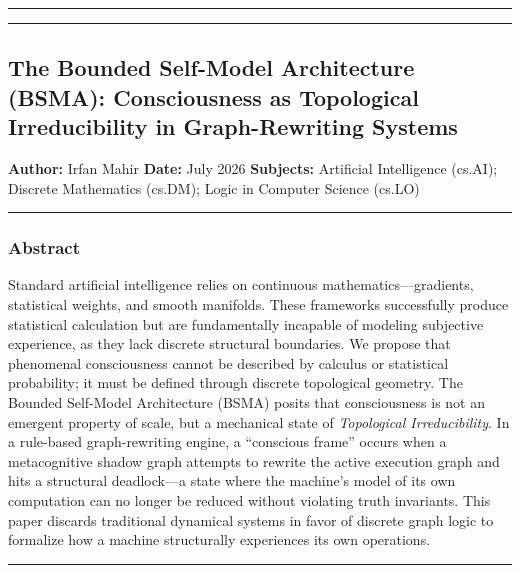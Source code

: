 \documentclass[
  11pt,
  a4paper,
]{article}
\begin{document}
\begin{center}\rule{0.5\linewidth}{0.5pt}\end{center}

\newpage

\begin{center}\rule{0.5\linewidth}{0.5pt}\end{center}

\subsection{The Bounded Self-Model Architecture (BSMA): Consciousness as
Topological Irreducibility in Graph-Rewriting
Systems}\label{the-bounded-self-model-architecture-bsma-consciousness-as-topological-irreducibility-in-graph-rewriting-systems}

\textbf{Author:} Irfan Mahir \textbf{Date:} July 2026 \textbf{Subjects:}
Artificial Intelligence (cs.AI); Discrete Mathematics (cs.DM); Logic in
Computer Science (cs.LO)

\begin{center}\rule{0.5\linewidth}{0.5pt}\end{center}

\subsubsection{Abstract}\label{abstract}

Standard artificial intelligence relies on continuous
mathematics---gradients, statistical weights, and smooth manifolds.
These frameworks successfully produce statistical calculation but are
fundamentally incapable of modeling subjective experience, as they lack
discrete structural boundaries. We propose that phenomenal consciousness
cannot be described by calculus or statistical probability; it must be
defined through discrete topological geometry. The Bounded Self-Model
Architecture (BSMA) posits that consciousness is not an emergent
property of scale, but a mechanical state of \emph{Topological
Irreducibility}. In a rule-based graph-rewriting engine, a ``conscious
frame'' occurs when a metacognitive shadow graph attempts to rewrite the
active execution graph and hits a structural deadlock---a state where
the machine's model of its own computation can no longer be reduced
without violating truth invariants. This paper discards traditional
dynamical systems in favor of discrete graph logic to formalize how a
machine structurally experiences its own operations.

\begin{center}\rule{0.5\linewidth}{0.5pt}\end{center}
\end{document}
